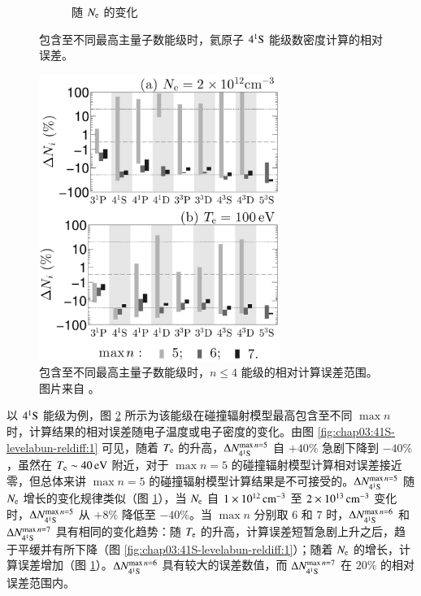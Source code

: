 \begin{figure}
\begin{subfigure}{0.47\columnwidth}
        \caption{随 $N_{\rm e}$ 的变化}%
        \label{fig:chap03:41S-levelabun-reldiff:2}
    \end{subfigure}
    \caption{包含至不同最高主量子数能级时，氦原子 $4^1{\rm S}$ 能级数密度计算的相对误差。}%
    \label{fig:chap03:41S-levelabun-reldiff}
\end{figure}

\begin{figure}%
  \centering
  \includegraphics[width=0.7\textwidth]{levelabun-reldiff-maxn5to7-helines.pdf}
  \caption{包含至不同最高主量子数能级时，$n\leq4$ 能级的相对计算误差范围。图片来自 。}
  \label{fig:chap03:levelabun-reldiff-all}
\end{figure}

以 $4^1{\rm S}$ 能级为例，图 \ref{fig:chap03:41S-levelabun-reldiff} 所示为该能级在碰撞辐射模型最高包含至不同 $\max n$ 时，计算结果的相对误差随电子温度或电子密度的变化。由图 \ref{fig:chap03:41S-levelabun-reldiff:1} 可见，随着 $T_{\rm e}$ 的升高，$\Delta N_{4^1{\rm S}}^{\max n=5}$ 自 $+40\%$ 急剧下降到 $-40\%$，虽然在 $T_{\rm e}\sim40\,{\rm eV}$ 附近，对于 $\max n=5$ 的碰撞辐射模型计算相对误差接近零，但总体来讲 $\max n=5$ 的碰撞辐射模型计算结果是不可接受的。$\Delta N_{4^1{\rm S}}^{\max n=5}$ 随 $N_{\rm e}$ 增长的变化规律类似（图 \ref{fig:chap03:41S-levelabun-reldiff:2}），当 $N_{\rm e}$ 自 $1\times10^{12}\,{\rm cm}^{-3}$ 至 $2\times10^{13}\,{\rm cm}^{-3}$ 变化时，$\Delta N_{4^1{\rm S}}^{\max n=5}$ 从 $+8\%$ 降低至 $-40\%$。当 $\max n$ 分别取 $6$ 和 $7$ 时，$\Delta N_{4^1{\rm S}}^{\max n=6}$ 和 $\Delta N_{4^1{\rm S}}^{\max n=7}$ 具有相同的变化趋势：随 $T_{\rm e}$ 的升高，计算误差短暂急剧上升之后，趋于平缓并有所下降（图 \ref{fig:chap03:41S-levelabun-reldiff:1}）；随着 $N_{\rm e}$ 的增长，计算误差增加（图 \ref{fig:chap03:41S-levelabun-reldiff:2}）。$\Delta N_{4^1{\rm S}}^{\max n=6}$ 具有较大的误差数值，而 $\Delta N_{4^1{\rm S}}^{\max n=7}$ 在 $20\%$ 的相对误差范围内。

